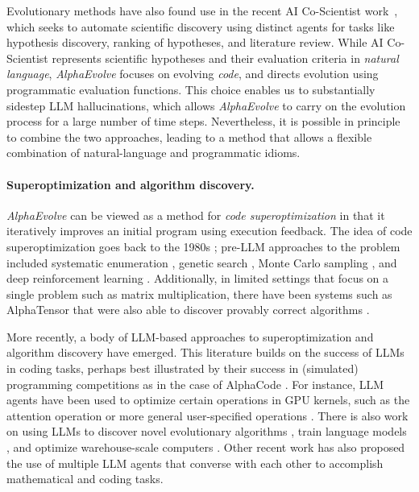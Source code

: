 \documentclass[logo,copyright,12pt]{googledeepmind}
\theoremstyle{definition}
\theoremstyle{remark}
\theoremstyle{plain}
\newcommand{\method}{\emph{AlphaEvolve}\xspace}
\begin{document}
Evolutionary methods have also found use in the recent AI Co-Scientist work~\citep{gottweis2025towards}, which seeks to automate scientific discovery using distinct agents for tasks like hypothesis discovery, ranking of hypotheses, and literature review.
While AI Co-Scientist represents scientific hypotheses and their evaluation criteria in \emph{natural language}, \method focuses on evolving \emph{code}, and directs evolution using programmatic evaluation functions.
This choice enables us to substantially sidestep LLM hallucinations, which allows \method to carry on the evolution process for a large number of time steps.
Nevertheless, it is possible in principle to combine the two approaches, leading to a method that allows a flexible combination of natural-language and programmatic idioms. 

\paragraph{Superoptimization and algorithm discovery.}
\method can be viewed as a method for \emph{code superoptimization} in that it iteratively improves an initial program using execution feedback. 
The idea of code superoptimization goes back to the 1980s \citep{Massalin87}; pre-LLM approaches to the problem included systematic enumeration \citep{Massalin87}, genetic search \citep{cooper2002adaptive}, Monte Carlo sampling \citep{schkufza2013stochastic}, and deep reinforcement learning \citep{mankowitz2023faster}.
Additionally, in limited settings that focus on a single problem such as matrix multiplication, there have been systems such as AlphaTensor that were also able to discover provably correct algorithms \citep{fawzi2022discovering}.

More recently, a body of LLM-based approaches to superoptimization and algorithm discovery have emerged.
This literature builds on the success of LLMs in coding tasks, perhaps best illustrated by their success in (simulated) programming competitions as in the case of AlphaCode \citep{li2022competitionlevel}.
For instance, LLM agents have been used to optimize certain operations in GPU kernels, such as the attention operation \citep{chen2025automating} or more general user-specified operations \citep{lange2025aicuda}.
There is also work on using LLMs to discover novel evolutionary algorithms \citep{lange2024large}, train language models \citep{lehman2024evolution}, and optimize warehouse-scale computers \citep{lin2025eco}.
Other recent work \citep{wu2023autogen} has also proposed the use of multiple LLM agents that converse with each other to accomplish mathematical and coding tasks. 
\end{document}
